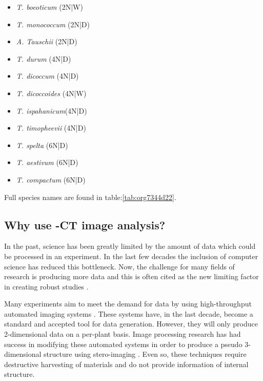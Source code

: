 \documentclass[11pt]{report}
\begin{document}
\begin{multicols}{3}

  \begin{itemize}
  \item{\textit{T. boeoticum} (2N|W)}
  \item{\textit{T. monococcum} (2N|D)}
  \item{\textit{A. Tauschii} (2N|D)}
  \end{itemize}

  \columnbreak

  \begin{itemize}
  \item{\textit{T. durum} (4N|D)}
  \item{\textit{T. dicoccum} (4N|D)}
  \item{\textit{T. dicoccoides} (4N|W)}
  \item{\textit{T. ispahanicum}(4N|D)}
  \item{\textit{T. timopheevii} (4N|D)}
  \end{itemize}

  \columnbreak

  \begin{itemize}
  \item{\textit{T. spelta} (6N|D)}
  \item{\textit{T. aestivum} (6N|D)}
  \item{\textit{T. compactum} (6N|D)}
  \end{itemize}

\end{multicols}
Full species names are found in table:\ref{tab:org7344d22}.

\subsection{Why use \textmu{}-CT image analysis?}
\label{sec:org5b0a628}
In the past, science has been greatly limited by the amount of data which could be processed in an experiment. In the last few decades the inclusion of computer science has reduced this bottleneck. Now, the challenge for many fields of research is producing more data and this is often cited as the new limiting factor in creating robust studies \cite{Furbank2011}.

Many experiments aim to meet the demand for data by using high-throughput automated imaging systems \cite{Naumann2007,Prasanna2013,Humplik2015}. These systems have, in the last decade, become a standard and accepted tool for data generation. However, they will only produce 2-dimensional data on a per-plant basis. Image processing research has had success in modifying these automated systems in order to produce a pseudo 3-dimensional structure using stero-imaging \cite{Roussel2016}. Even so, these techniques require destructive harvesting of materials and do not provide information of internal structure.
\end{document}
